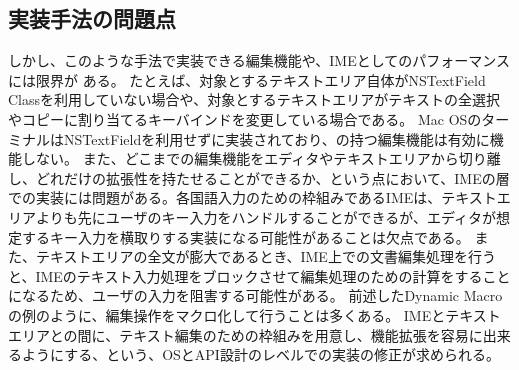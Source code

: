 \subsection{実装手法の問題点}

しかし、このような手法で実装できる編集機能や、IMEとしてのパフォーマンスには限界が
ある。
たとえば、対象とするテキストエリア自体がNSTextField Classを利用していない場合や、対象とするテキストエリアがテキストの全選択やコピーに割り当てるキーバインドを変更している場合である。
Mac OSのターミナルはNSTextFieldを利用せずに実装されており、{\system}の持つ編集機能は有効に機能しない。
%
また、どこまでの編集機能をエディタやテキストエリアから切り離し、どれだけの拡張性を持たせることができるか、という点において、IMEの層での実装には問題がある。各国語入力のための枠組みであるIMEは、テキストエリアよりも先にユーザのキー入力をハンドルすることができるが、エディタが想定するキー入力を横取りする実装になる可能性があることは欠点である。
%
また、テキストエリアの全文が膨大であるとき、IME上での文書編集処理を行うと、IMEのテキスト入力処理をブロックさせて編集処理のための計算をすることになるため、ユーザの入力を阻害する可能性がある。
%
前述したDynamic Macroの例のように、編集操作をマクロ化して行うことは多くある。
IMEとテキストエリアとの間に、テキスト編集のための枠組みを用意し、機能拡張を容易に出来るようにする、という、OSとAPI設計のレベルでの実装の修正が求められる。

